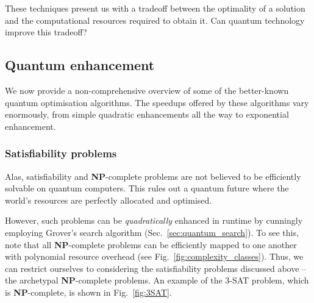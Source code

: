 These techniques present us with a tradeoff between the optimality of a solution and the computational resources required to obtain it. Can quantum technology improve this tradeoff?

\subsection{Quantum enhancement}

We now provide a non-comprehensive overview of some of the better-known quantum optimisation algorithms. The speedups offered by these algorithms vary enormously, from simple quadratic enhancements all the way to exponential enhancement.

\subsubsection{Satisfiability problems}



Alas, satisfiability and \textbf{NP}-complete problems are not believed to be efficiently solvable on quantum computers. This rules out a quantum future where the world's resources are perfectly allocated and optimised.

However, such problems can be \textit{quadratically} enhanced in runtime by cunningly employing Grover's search algorithm (Sec.~\ref{sec:quantum_search}). To see this, note that all \textbf{NP}-complete problems can be efficiently mapped to one another with polynomial resource overhead (see Fig.~\ref{fig:complexity_classes}). Thus, we can restrict ourselves to considering the satisfiability problems discussed above -- the archetypal \textbf{NP}-complete problems. An example of the 3-\textsc{SAT} problem, which is \textbf{NP}-complete, is shown in Fig.~\ref{fig:3SAT}.

